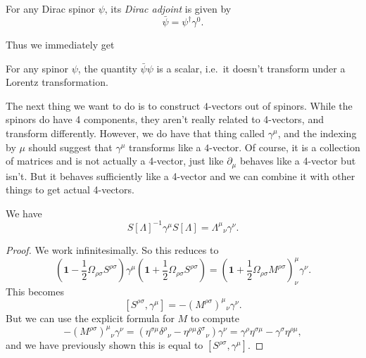 \documentclass[a4paper]{article}
\begin{document}
\begin{defi}
  For any Dirac spinor $\psi$, its \emph{Dirac adjoint} is given by
  \[
    \bar\psi = \psi^\dagger \gamma^0.
  \]
\end{defi}
Thus we immediately get
\begin{cor}
  For any spinor $\psi$, the quantity $\bar \psi \psi$ is a scalar, i.e.\ it doesn't transform under a Lorentz transformation.
\end{cor}

The next thing we want to do is to construct $4$-vectors out of spinors. While the spinors do have 4 components, they aren't really related to 4-vectors, and transform differently. However, we do have that thing called $\gamma^\mu$, and the indexing by $\mu$ should suggest that $\gamma^\mu$ transforms like a $4$-vector. Of course, it is a collection of matrices and is not actually a 4-vector, just like $\partial_\mu$ behaves like a 4-vector but isn't. But it behaves sufficiently like a 4-vector and we can combine it with other things to get actual 4-vectors.


\begin{prop}
  We have
  \[
    S[\Lambda]^{-1} \gamma^\mu S[\Lambda] = \Lambda^\mu\!_\nu \gamma^\nu.
  \]
\end{prop}

\begin{proof}
  We work infinitesimally. So this reduces to
  \[
    \left(\mathbf{1} - \frac{1}{2} \Omega_{\rho\sigma} S^{\rho\sigma}\right) \gamma^\mu \left(\mathbf{1} + \frac{1}{2} \Omega_{\rho\sigma}S^{\rho\sigma}\right) = \left(\mathbf{1} + \frac{1}{2}\Omega_{\rho\sigma}M^{\rho\sigma}\right)^\mu_\nu\gamma^\nu.
  \]
  This becomes
  \[
    [S^{\rho\sigma}, \gamma^\mu] = -(M^{\rho\sigma})^\mu\!_\nu\gamma^\nu.
  \]
  But we can use the explicit formula for $M$ to compute
  \[
    -(M^{\rho\sigma})^\mu\!_\nu \gamma^\nu = (\eta^{\sigma\mu} \delta^\rho\!_\nu - \eta^{\rho\mu}\delta^\sigma\!_\nu) \gamma^\nu = \gamma^\rho\eta^{\sigma\mu} - \gamma^\sigma\eta^{\rho\mu},
  \]
  and we have previously shown this is equal to $[S^{\rho\sigma}, \gamma^\mu]$.
\end{proof}
\end{document}
